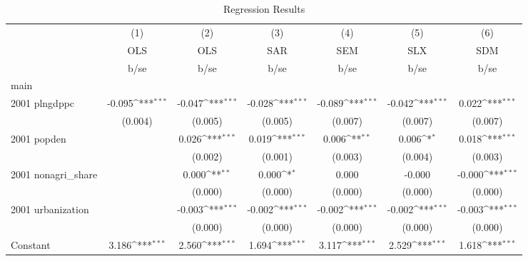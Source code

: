 \begin{table}[htbp]\centering
\def\sym#1{\ifmmode^{#1}\else\(^{#1}\)\fi}
\caption{Regression Results}
\begin{tabular}{l*{6}{c}}
\hline\hline
                    &\multicolumn{1}{c}{(1)}&\multicolumn{1}{c}{(2)}&\multicolumn{1}{c}{(3)}&\multicolumn{1}{c}{(4)}&\multicolumn{1}{c}{(5)}&\multicolumn{1}{c}{(6)}\\
                    &\multicolumn{1}{c}{OLS}&\multicolumn{1}{c}{OLS}&\multicolumn{1}{c}{SAR}&\multicolumn{1}{c}{SEM}&\multicolumn{1}{c}{SLX}&\multicolumn{1}{c}{SDM}\\
                    &        b/se         &        b/se         &        b/se         &        b/se         &        b/se         &        b/se         \\
\hline
main                &                     &                     &                     &                     &                     &                     \\
2001 plngdppc       &      -0.095\sym{***}&      -0.047\sym{***}&      -0.028\sym{***}&      -0.089\sym{***}&      -0.042\sym{***}&       0.022\sym{***}\\
                    &     (0.004)         &     (0.005)         &     (0.005)         &     (0.007)         &     (0.007)         &     (0.007)         \\
2001 popden         &                     &       0.026\sym{***}&       0.019\sym{***}&       0.006\sym{**} &       0.006\sym{*}  &       0.018\sym{***}\\
                    &                     &     (0.002)         &     (0.001)         &     (0.003)         &     (0.004)         &     (0.003)         \\
2001 nonagri\_share  &                     &       0.000\sym{**} &       0.000\sym{*}  &       0.000         &      -0.000         &      -0.000\sym{***}\\
                    &                     &     (0.000)         &     (0.000)         &     (0.000)         &     (0.000)         &     (0.000)         \\
2001 urbanization   &                     &      -0.003\sym{***}&      -0.002\sym{***}&      -0.002\sym{***}&      -0.002\sym{***}&      -0.003\sym{***}\\
                    &                     &     (0.000)         &     (0.000)         &     (0.000)         &     (0.000)         &     (0.000)         \\
Constant            &       3.186\sym{***}&       2.560\sym{***}&       1.694\sym{***}&       3.117\sym{***}&       2.529\sym{***}&       1.618\sym{***}\\

\end{tabular}
\end{table}
